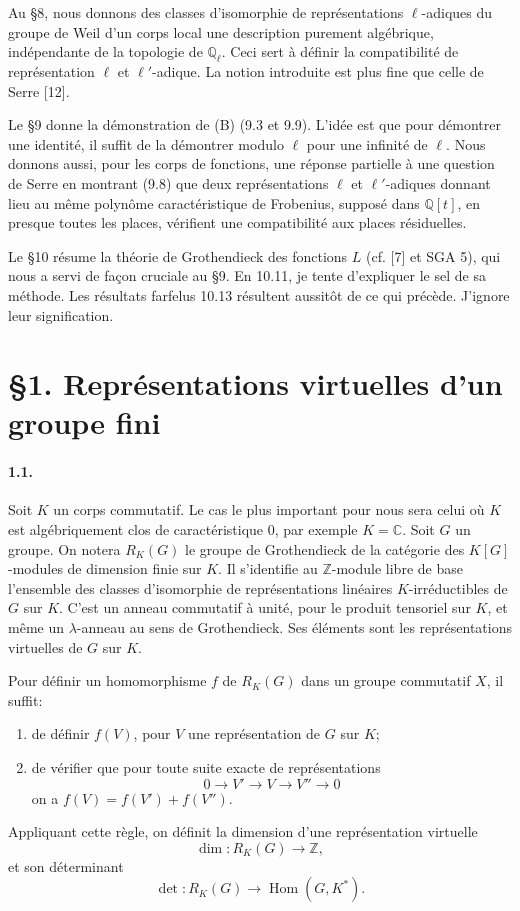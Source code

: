 \documentclass[10pt,letterpaper]{article}
\newcommand{\C}{\mathbb C}
\newcommand{\Q}{\mathbb Q}
\newcommand{\Z}{\mathbb Z}
\newcommand{\Hom}{\operatorname{Hom}}
\providecommand{\Hom}{\operatorname{Hom}}
\providecommand{\Hom}{\operatorname{Hom}}
\providecommand{\Hom}{\operatorname{Hom}}
\begin{document}
Au §8, nous donnons des classes d'isomorphie de représentations \(\ell\)-adiques du groupe de Weil d'un corps local une description purement algébrique, indépendante de la topologie de \(\Q_\ell\). Ceci sert à définir la compatibilité de représentation \(\ell\) et \(\ell'\)-adique. La notion introduite est plus fine que celle de Serre [12].

Le §9 donne la démonstration de (B) (9.3 et 9.9). L'idée est que pour démontrer une identité, il suffit de la démontrer modulo \(\ell\) pour une infinité de \(\ell\). Nous donnons aussi, pour les corps de fonctions, une réponse partielle à une question de Serre en montrant (9.8) que deux représentations \(\ell\) et \(\ell'\)-adiques donnant lieu au même polynôme caractéristique de Frobenius, supposé dans \(\Q[t]\), en presque toutes les places, vérifient une compatibilité aux places résiduelles.

Le §10 résume la théorie de Grothendieck des fonctions \(L\) (cf. [7] et SGA 5), qui nous a servi de façon cruciale au §9. En 10.11, je tente d'expliquer le sel de sa méthode. Les résultats farfelus 10.13 résultent aussitôt de ce qui précède. J'ignore leur signification.

\section*{\S1. Représentations virtuelles d'un groupe fini}

\paragraph{1.1.} Soit \(K\) un corps commutatif. Le cas le plus important pour nous sera celui où \(K\) est algébriquement clos de caractéristique \(0\), par exemple \(K=\C\). Soit \(G\) un groupe. On notera \(R_K(G)\) le groupe de Grothendieck de la catégorie des \(K[G]\)-modules de dimension finie sur \(K\). Il s'identifie au \(\Z\)-module libre de base l'ensemble des classes d'isomorphie de représentations linéaires \(K\)-irréductibles de \(G\) sur \(K\). C'est un anneau commutatif à unité, pour le produit tensoriel sur \(K\), et même un \(\lambda\)-anneau au sens de Grothendieck. Ses éléments sont les représentations virtuelles de \(G\) sur \(K\).

Pour définir un homomorphisme \(f\) de \(R_K(G)\) dans un groupe commutatif \(X\), il suffit:
\begin{enumerate}[label=\alph*)]
\item de définir \(f(V)\), pour \(V\) une représentation de \(G\) sur \(K\);
\item de vérifier que pour toute suite exacte de représentations
\[
0\longrightarrow V'\longrightarrow V\longrightarrow V''\longrightarrow0
\]
on a \(f(V)=f(V')+f(V'')\).
\end{enumerate}
Appliquant cette règle, on définit la dimension d'une représentation virtuelle
\[
\dim:R_K(G)\longrightarrow\Z,
\]
et son déterminant
\[
\det:R_K(G)\longrightarrow\Hom(G,K^*).
\]
\end{document}
